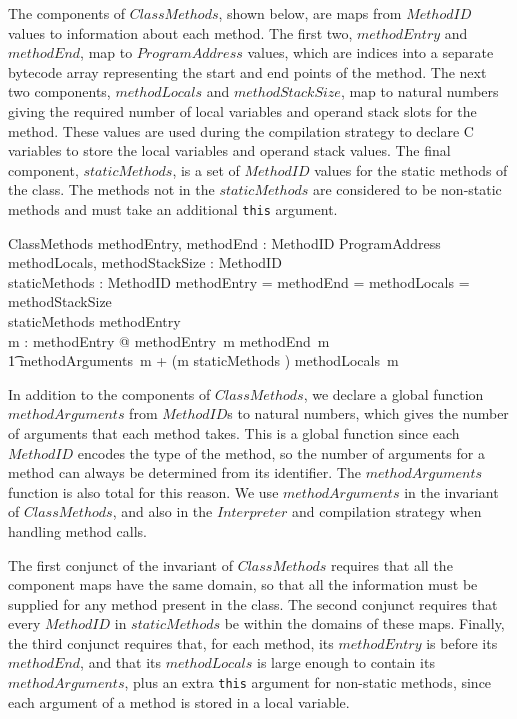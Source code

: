 The components of $ClassMethods$, shown below, are maps from
$MethodID$ values to information about each method.
The first two, $methodEntry$ and $methodEnd$, map to $ProgramAddress$
values, which are indices into a separate bytecode array representing
the start and end points of the method.
The next two components, $methodLocals$ and $methodStackSize$, map to
natural numbers giving the required number of local variables and
operand stack slots for the method.
These values are used during the compilation strategy to declare C
variables to store the local variables and operand stack values.
The final component, $staticMethods$, is a set of $MethodID$ values
for the static methods of the class.
The methods not in the $staticMethods$ are considered to be non-static
methods and must take an additional \texttt{this} argument.
\begin{schema}{ClassMethods}
  methodEntry, methodEnd : MethodID \pfun ProgramAddress \\
  methodLocals, methodStackSize : MethodID \pfun \nat \\
  staticMethods : \finset MethodID
\where
  \dom methodEntry = \dom methodEnd = \dom methodLocals = \dom methodStackSize \\
  staticMethods \subseteq \dom methodEntry \\
  \forall m : \dom methodEntry @ methodEntry~m \leq methodEnd~m \\
  \t1 \land methodArguments~m + (\IF m \in staticMethods  ) \leq methodLocals~m 
\end{schema}
In addition to the components of $ClassMethods$, we declare a global
function $methodArguments$ from $MethodID$s to natural numbers, which
gives the number of arguments that each method takes.
This is a global function since each $MethodID$ encodes the type of
the method, so the number of arguments for a method can always be
determined from its identifier.
The $methodArguments$ function is also total for this reason.
We use $methodArguments$ in the invariant of $ClassMethods$, and also
in the $Interpreter$ and compilation strategy when handling method
calls.

The first conjunct of the invariant of $ClassMethods$ requires that
all the component maps have the same domain, so that all the
information must be supplied for any method present in the class.
The second conjunct requires that every $MethodID$ in $staticMethods$
be within the domains of these maps.
Finally, the third conjunct requires that, for each method, its
$methodEntry$ is before its $methodEnd$, and that its $methodLocals$
is large enough to contain its $methodArguments$, plus an extra
\texttt{this} argument for non-static methods, since each argument of
a method is stored in a local variable.

